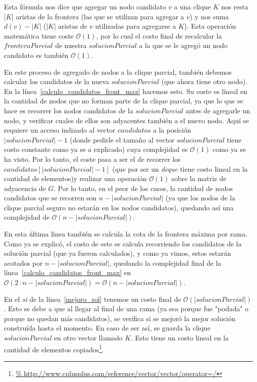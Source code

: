 \par Esta f\'ormula nos dice que agregar un nodo candidato $v$ a una clique $K$
    nos resta $|K|$ aristas de la frontera (las que se utilizan para agregar
    a $v$) y nos suma $d(v) - |K|$ ($|K|$ aristas de $v$ utilizadas para agregarse
    a $K$). Esta operaci\'on matem\'atica tiene coste $\mathcal O(1)$, por lo cual
    el costo final de recalcular la $fronteraParcial$ de nuestra $solucionParcial$
    a la que se le agreg\'o un nodo candidato es tambi\'en $\mathcal O(1)$.

\par En este proceso de agregado de nodos a la clique parcial, tambi\'en debemos
    calcular los candidatos de la nueva $solucionParcial$ (que ahora tiene otro
    nodo). En la l\'inea~\ref{calculo_candidatos_front_max} hacemos esto. Su coste
    es l\'ineal en la cantidad de nodos que no forman parte de la clique parcial,
    ya que lo que se hace es recorrer los nodos candidatos de la $solucionParcial$
    antes de agregarle un nodo, y verificar cuales de ellos son adyacentes tambi\'en
    a el nuevo nodo. Aqu\'i se requiere un acceso indizado al vector $candidatos$
    a la posici\'on $|solucionParcial|-1$ (donde pedirle el tama\~no al vector
    $solucionParcial$ tiene costo constante como ya se a explicado) cuya complejidad
    es $\mathcal O(1)$ como ya se ha visto. Por lo tanto, el coste pasa a ser el de
    recorrer los $candidatos[|solucionParcial|-1]$ (que por ser un \emph{deque} tiene
    costo lineal en la cantidad de elementos)y realizar una operaci\'on
    $\mathcal O(1)$ sobre la matriz de adyacencia de $G$. Por lo tanto, en el peor
    de los casos, la cantidad de nodos candidatos que se recorren son $n - |solucionParcial|$
    (ya que los nodos de la clique parcial seguro no estar\'an en los nodos candidatos),
    quedando as\'i una complejidad de $\mathcal O(n - |solucionParcial|)$.

\par En esta \'ultima l\'inea tambi\'en se calcula la cota de la frontera m\'axima
    por rama. Como ya se explic\'o, el costo de este se calcula recorriendo los
    candidatos de la soluci\'on parcial (que ya fueron calculados), y como ya vimos,
    estos estar\'an acotados por $n - |solucionParcial|$, quedando la complejidad
    final de la l\'inea~\ref{calculo_candidatos_front_max} en $\mathcal O(2\cdot
    n - |solucionParcial|) = \mathcal O(n - |solucionParcial|)$.

\par En el \emph{si} de la l\'inea~\ref{mejoro_sol} tenemos un costo final de
    $\mathcal O(|solucionParcial|)$. Esto se debe a que al llegar al final de una
    rama (ya sea porque fue "podada" o porque no quedan m\'as candidatos), se verifica
    si se mejor\'o la mejor soluci\'on constru\'ida hasta el momento. En caso de ser
    as\'i, se guarda la clique $solucionParcial$ en otro vector llamado $K$. Esto tiene
    un costo lineal en la cantidad de elementos copiados\footnote{\url{%
    http://www.cplusplus.com/reference/vector/vector/operator=/}}.

